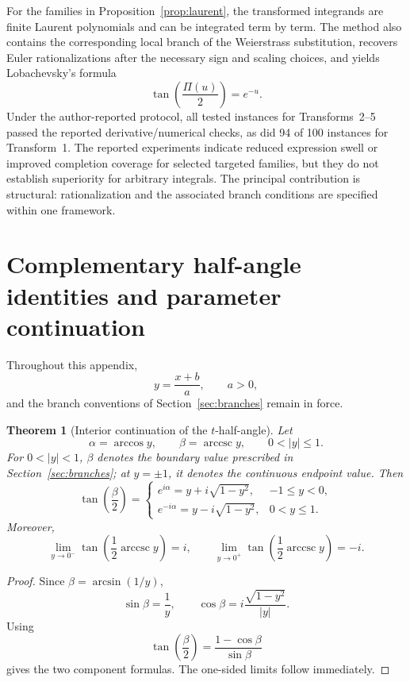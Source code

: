 \documentclass[11pt]{article}
\newtheorem{theorem}{Theorem}[section]
\theoremstyle{remark}
\DeclareMathOperator{\arccsc}{arccsc}
\begin{document}
For the families in Proposition~\ref{prop:laurent}, the transformed integrands are finite Laurent polynomials and can be integrated term by term. The method also contains the corresponding local branch of the Weierstrass substitution, recovers Euler rationalizations after the necessary sign and scaling choices, and yields Lobachevsky's formula
\[
\tan\!\left(\frac{\Pi(u)}{2}\right)=e^{-u}.
\]
Under the author-reported protocol, all tested instances for Transforms~2--5 passed the reported derivative/numerical checks, as did 94 of 100 instances for Transform~1. The reported experiments indicate reduced expression swell or improved completion coverage for selected targeted families, but they do not establish superiority for arbitrary integrals. The principal contribution is structural: rationalization and the associated branch conditions are specified within one framework.

\appendix

\section{Complementary half-angle identities and parameter continuation}
\label{app:continuation}

Throughout this appendix,
\[
y=\frac{x+b}{a},
\qquad a>0,
\]
and the branch conventions of Section~\ref{sec:branches} remain in force.

\begin{theorem}[Interior continuation of the $t$-half-angle]
\label{thm:interior-t}
Let
\[
\alpha=\arccos y,
\qquad
\beta=\arccsc y,
\qquad
0<|y|\le1.
\]
For $0<|y|<1$, $\beta$ denotes the boundary value prescribed in Section~\ref{sec:branches}; at $y=\pm1$, it denotes the continuous endpoint value. Then
\[
\tan\!\left(\frac{\beta}{2}\right)=
\begin{cases}
e^{i\alpha}=y+i\sqrt{1-y^2},&-1\le y<0,\\[1mm]
e^{-i\alpha}=y-i\sqrt{1-y^2},&0<y\le1.
\end{cases}
\]
Moreover,
\[
\lim_{y\to0^-}\tan\!\left(\frac{1}{2}\arccsc y\right)=i,
\qquad
\lim_{y\to0^+}\tan\!\left(\frac{1}{2}\arccsc y\right)=-i.
\]
\end{theorem}

\begin{proof}
Since $\beta=\arcsin(1/y)$,
\[
\sin\beta=\frac{1}{y},
\qquad
\cos\beta=i\frac{\sqrt{1-y^2}}{|y|}.
\]
Using
\[
\tan\!\left(\frac{\beta}{2}\right)=\frac{1-\cos\beta}{\sin\beta}
\]
gives the two component formulas. The one-sided limits follow immediately.
\end{proof}
\end{document}
